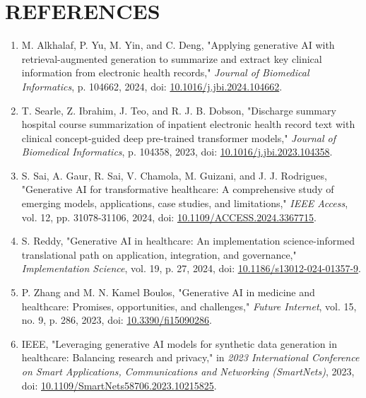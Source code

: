 \chapter*{\fontsize{16}{19}\selectfont\textbf{REFERENCES}}
\thispagestyle{plain}

\begin{enumerate}
    \item M. Alkhalaf, P. Yu, M. Yin, and C. Deng, "Applying generative AI with retrieval-augmented generation to summarize and extract key clinical information from electronic health records," \textit{Journal of Biomedical Informatics}, p. 104662, 2024, doi: \href{https://doi.org/10.1016/j.jbi.2024.104662}{10.1016/j.jbi.2024.104662}.
    
    \item T. Searle, Z. Ibrahim, J. Teo, and R. J. B. Dobson, "Discharge summary hospital course summarization of inpatient electronic health record text with clinical concept-guided deep pre-trained transformer models," \textit{Journal of Biomedical Informatics}, p. 104358, 2023, doi: \href{https://doi.org/10.1016/j.jbi.2023.104358}{10.1016/j.jbi.2023.104358}.
    
    \item S. Sai, A. Gaur, R. Sai, V. Chamola, M. Guizani, and J. J. Rodrigues, "Generative AI for transformative healthcare: A comprehensive study of emerging models, applications, case studies, and limitations," \textit{IEEE Access}, vol. 12, pp. 31078-31106, 2024, doi: \href{https://doi.org/10.1109/ACCESS.2024.3367715}{10.1109/ACCESS.2024.3367715}.
    
    \item S. Reddy, "Generative AI in healthcare: An implementation science-informed translational path on application, integration, and governance," \textit{Implementation Science}, vol. 19, p. 27, 2024, doi: \href{https://doi.org/10.1186/s13012-024-01357-9}{10.1186/s13012-024-01357-9}.
    
    \item P. Zhang and M. N. Kamel Boulos, "Generative AI in medicine and healthcare: Promises, opportunities, and challenges," \textit{Future Internet}, vol. 15, no. 9, p. 286, 2023, doi: \href{https://doi.org/10.3390/fi15090286}{10.3390/fi15090286}.
    
    \item IEEE, "Leveraging generative AI models for synthetic data generation in healthcare: Balancing research and privacy," in \textit{2023 International Conference on Smart Applications, Communications and Networking (SmartNets)}, 2023, doi: \href{https://doi.org/10.1109/SmartNets58706.2023.10215825}{10.1109/SmartNets58706.2023.10215825}.
    

\end{enumerate}
